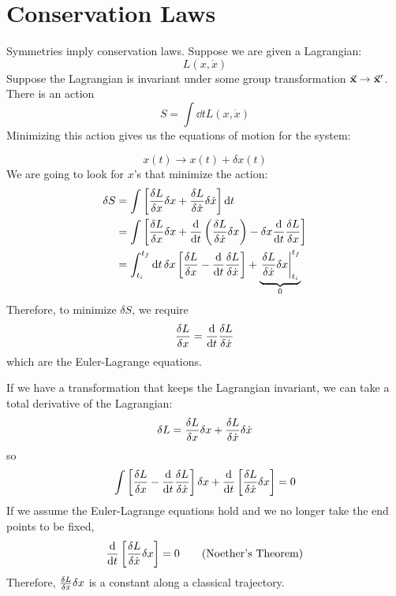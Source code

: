 \documentclass[a4paper,twoside,master.tex]{subfiles}
\begin{document}
\section{Conservation Laws}
\label{sec:conservation_laws}

Symmetries imply conservation laws. Suppose we are given a Lagrangian:
\begin{equation}
    L(x, \dot{x})
\end{equation}
Suppose the Lagrangian is invariant under some group transformation $\va{ x} \to\va{ x}' $. There is an action
\begin{equation}
    S = \int \dd{t} L(x,\dot{x})
\end{equation}
Minimizing this action gives us the equations of motion for the system:

\begin{equation}
    x(t) \to x(t) + \delta x(t)
\end{equation}
We are going to look for $ x $'s that minimize the action:
\begin{align}
    \delta S &= \int \left[ \fdv{L}{x} \delta x + \fdv{L}{\dot{x}} \delta \dot{x} \right] \dd{t} \\
    &= \int \left[ \fdv{L}{x} \delta x + \dv{t} \left( \fdv{L}{\dot{x}} \delta x \right) - \delta x \dv{t} \fdv{L}{x} \right] \\
    &= \int_{t_i}^{t_f} \dd{t} \delta x \left[ \fdv{L}{x} - \dv{t} \fdv{L}{\dot{x}} \right] + \underbrace{\eval{\fdv{L}{\dot{x}} \delta x}_{t_i}^{t_f}}_{0}
\end{align}
Therefore, to minimize $ \delta S $, we require
\begin{equation}
    \fdv{L}{x} = \dv{t} \fdv{L}{\dot{x}}
\end{equation}
which are the Euler-Lagrange equations.

If we have a transformation that keeps the Lagrangian invariant, we can take a total derivative of the Lagrangian:
\begin{equation}
    \delta L = \fdv{L}{x} \delta x + \fdv{L}{\dot{x}} \delta \dot{x}
\end{equation}
so
\begin{equation}
    \int \left[ \fdv{L}{x} - \dv{t} \fdv{L}{\dot{x}} \right] \delta x + \dv{t}\left[ \fdv{L}{\dot{x}} \delta x \right] = 0
\end{equation}
If we assume the Euler-Lagrange equations hold and  we no longer take the end points to be fixed,
\begin{equation}\label{eq:noethers_theorem}
    \dv{t} \left[ \fdv{L}{\dot{x}} \delta x \right] = 0\tag{Noether's Theorem}
\end{equation}
Therefore, $ \fdv{L}{\dot{x}} \delta x $ is a constant along a classical trajectory.
\end{document}
